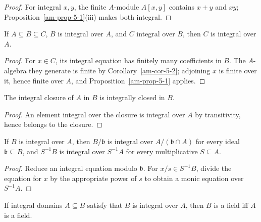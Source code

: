 \begin{proof}
For integral $x,y$, the finite $A$-module $A[x,y]$ contains $x+y$ and $xy$;
Proposition~\ref{am-prop-5-1}(iii) makes both integral.
\end{proof}
\begin{corollary}[Transitivity]
\label{am-cor-5-4}
\uses{}
If $A\subseteq B\subseteq C$, $B$ is integral over $A$, and $C$ integral over
$B$, then $C$ is integral over $A$.
\end{corollary}
\begin{proof}
For $x\in C$, its integral equation has finitely many coefficients in $B$.
The $A$-algebra they generate is finite by Corollary~\ref{am-cor-5-2}; adjoining
$x$ is finite over it, hence finite over $A$, and Proposition~\ref{am-prop-5-1}
applies.
\end{proof}
\begin{corollary}
\label{am-cor-5-5}
\uses{}
The integral closure of $A$ in $B$ is integrally closed in $B$.
\end{corollary}
\begin{proof}
An element integral over the closure is integral over $A$ by transitivity, hence
belongs to the closure.
\end{proof}
\begin{proposition}
\label{am-prop-5-6}
\uses{}
If $B$ is integral over $A$, then $B/\mathfrak{b}$ is integral over
$A/(\mathfrak{b}\cap A)$ for every ideal $\mathfrak{b}\subseteq B$, and $S^{-1}B$ is
integral over $S^{-1}A$ for every multiplicative $S\subseteq A$.
\end{proposition}
\begin{proof}
Reduce an integral equation modulo $\mathfrak{b}$.  For $x/s\in S^{-1}B$, divide
the equation for $x$ by the appropriate power of $s$ to obtain a monic equation
over $S^{-1}A$.
\end{proof}
\begin{proposition}
\label{am-prop-5-7}
\uses{}
If integral domains $A\subseteq B$ satisfy that $B$ is integral over $A$, then
$B$ is a field iff $A$ is a field.
\end{proposition}
